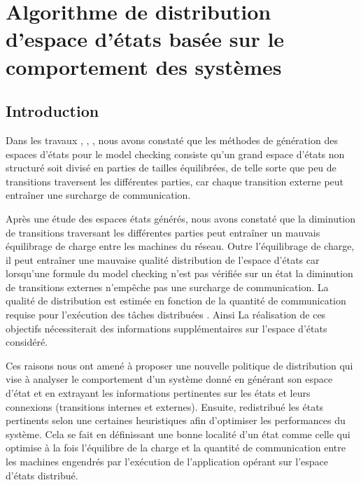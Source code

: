\chapter{Algorithme de distribution d’espace d’états basée sur le comportement des systèmes}
	\minitoc
	\newpage

 \section{Introduction}
Dans les travaux \citep{Saidouni2012}, \citep{TabibSaidouni2016}, \citep{BENSETIRA2017}, nous avons constaté que les méthodes de génération des espaces d’états pour le model checking consiste  qu’un grand espace d'états non structuré soit divisé en parties de tailles équilibrées, de telle sorte que peu de transitions traversent les différentes  parties, car chaque transition externe peut entraîner une surcharge de communication.

Après une étude des espaces états générés, nous avons constaté que la diminution de transitions traversant les différentes parties peut entraîner un mauvais équilibrage de charge entre les machines du réseau. Outre l’équilibrage de charge, il peut entraîner une mauvaise qualité distribution de l'espace d'états car lorsqu'une formule du model checking n'est pas vérifiée sur un état la diminution de transitions externes n'empêche pas une surcharge de communication. La qualité de distribution est estimée en fonction de la quantité de communication requise pour l’exécution des tâches distribuées \citep{EzekielLuttgen2008}. Ainsi La réalisation de ces objectifs nécessiterait des informations supplémentaires sur l’espace d’états considéré. 

Ces raisons nous ont amené à proposer une nouvelle politique de distribution qui vise à analyser le comportement d’un système donné en générant son espace d’état et en extrayant les informations pertinentes sur les états et leurs connexions (transitions internes et externes). Ensuite, redistribué les états pertinents selon une certaines heuristiques afin d’optimiser les performances du système. Cela se fait en définissant une bonne localité d’un état comme celle qui optimise à la fois l’équilibre de la charge et la quantité de communication entre les machines engendrés par l’exécution de l’application opérant sur l’espace d’états distribué.
 
